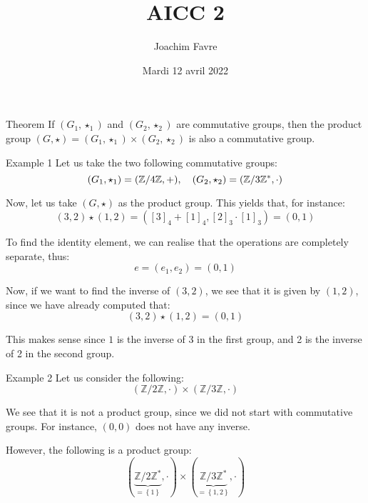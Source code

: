 \documentclass[a4paper]{article}
\title{AICC 2}
\author{Joachim Favre}
\date{Mardi 12 avril 2022}
\begin{document}
\maketitle


\begin{parag}{Theorem}
    If $\left(G_1, \star_1\right)$ and $\left(G_2, \star_2\right)$ are commutative groups, then the product group $\left(G, \star\right) = \left(G_1, \star_1\right) \times \left(G_2, \star_2\right)$ is also a commutative group.
\end{parag}

\begin{parag}{Example 1}
    Let us take the two following commutative groups:
    \[\left(G_1, \star_1\right) = \left(\mathbb{Z} / 4\mathbb{Z}, +\right), \mathspace \left(G_2, \star_2\right) = \left(\mathbb{Z} / 3\mathbb{Z}^*, \cdot\right)\]

    Now, let us take $\left(G, \star\right)$ as the product group. This yields that, for instance:
    \[\left(3, 2\right) \star \left(1, 2\right) = \left(\left[3\right]_4 + \left[1\right]_4, \left[2\right]_3 \cdot \left[1\right]_3\right) = \left(0, 1\right)\]

    To find the identity element, we can realise that the operations are completely separate, thus:
    \[e = \left(e_1, e_2\right) = \left(0, 1\right)\]

    Now, if we want to find the inverse of $\left(3, 2\right)$, we see that it is given by $\left(1, 2\right)$, since we have already computed that:
    \[\left(3, 2\right) \star \left(1, 2\right) = \left(0, 1\right)\]

    This makes sense since $1$ is the inverse of 3 in the first group, and 2 is the inverse of 2 in the second group.
\end{parag}

\begin{parag}{Example 2}
    Let us consider the following:
    \[\left(\mathbb{Z} / 2\mathbb{Z}, \cdot\right) \times \left(\mathbb{Z} / 3\mathbb{Z}, \cdot\right)\]

    We see that it is not a product group, since we did not start with commutative groups. For instance, $\left(0, 0\right)$ does not have any inverse.

    However, the following is a product group:
    \[\left(\underbrace{\mathbb{Z} / 2\mathbb{Z}^*}_{= \left\{1\right\}}, \cdot\right) \times \left(\underbrace{\mathbb{Z} / 3\mathbb{Z}^*}_{= \left\{1, 2\right\}}, \cdot\right)\]
\end{parag}
\end{document}
